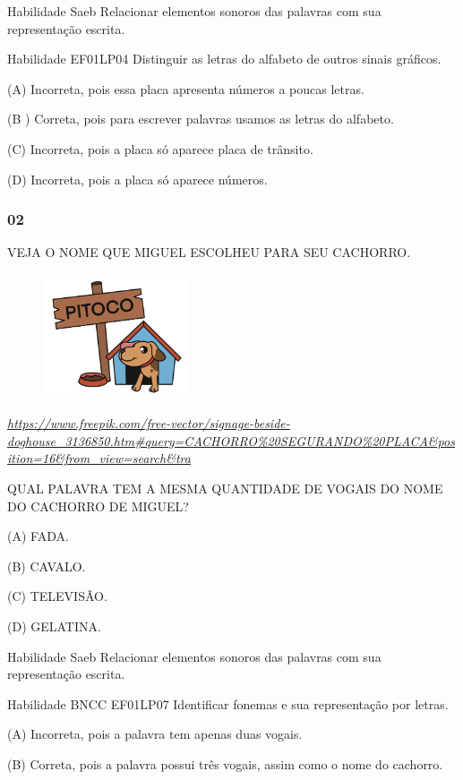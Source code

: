 Habilidade Saeb Relacionar elementos sonoros das palavras com sua
representação escrita.

Habilidade EF01LP04 Distinguir as letras do alfabeto de outros sinais
gráficos.

(A) Incorreta, pois essa placa apresenta números a poucas letras.

(B ) Correta, pois para escrever palavras usamos as letras do alfabeto.

(C) Incorreta, pois a placa só aparece placa de trânsito.

(D) Incorreta, pois a placa só aparece
números.\protect\hypertarget{_heading=h.vsxh2fkjtnnn}{}{}

\subsubsection{02}\label{section-58}

VEJA O NOME QUE MIGUEL ESCOLHEU PARA SEU CACHORRO.

\includegraphics[width=2.53194in,height=1.44514in]{media/image226.png}

\href{https://www.freepik.com/free-vector/signage-beside-doghouse_3136850.htm\#query=CACHORRO\%20SEGURANDO\%20PLACA\&position=16\&from_view=search\&tra}{\emph{https://www.freepik.com/free-vector/signage-beside-doghouse\_3136850.htm\#query=CACHORRO\%20SEGURANDO\%20PLACA\&position=16\&from\_view=search\&tra}}

QUAL PALAVRA TEM A MESMA QUANTIDADE DE VOGAIS DO NOME DO CACHORRO DE
MIGUEL?

(A) FADA.

(B) CAVALO.

(C) TELEVISÃO.

(D) GELATINA.

Habilidade Saeb Relacionar elementos sonoros das palavras com sua
representação escrita.

Habilidade BNCC EF01LP07 Identificar fonemas e sua representação por
letras.

(A) Incorreta, pois a palavra tem apenas duas vogais.

(B) Correta, pois a palavra possui três vogais, assim como o nome do
cachorro.

